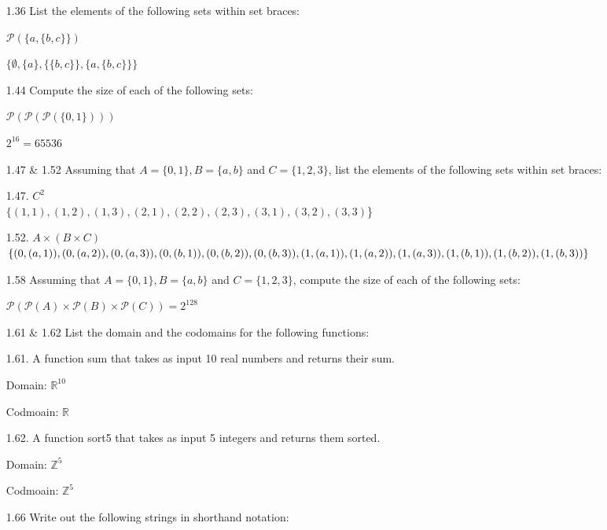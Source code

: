 \documentclass[10pt]{article}
\begin{document}
\begin{enumerate}
      \item [1.36] List the elements of the following sets within set braces:

            $\mathcal{P}(\{a,\{b, c\}\})$

            $\{\emptyset , \{a\}, \{\{b, c\}\}, \{a, \{b, c\}\}\}$

      \item [1.44] Compute the size of each of the following sets:

            $\mathcal{P}(\mathcal{P}(\mathcal{P}(\{0,1\})))$

            $2^{16} = 65536$

      \item [1.47 \& 1.52] Assuming that $A=\{0,1\}, B=\{a, b\}$ and $C=\{1,2,3\}$, list the elements of the following sets within set braces:

            1.47. $C^2$
            \\$\{(1,1), (1,2), (1,3), (2,1), (2,2), (2,3), (3,1), (3,2), (3,3)$\}


                  1.52. $A \times(B \times C)$
            \\$\{(0,(a,1)), (0,(a,2)), (0,(a,3)), (0,(b,1)), (0,(b,2)), (0,(b,3)), (1,(a,1)), (1,(a,2)), (1,(a,3)),
            \\(1,(b,1)), (1,(b,2)), (1,(b,3))\}$

      \item [1.58] Assuming that $A=\{0,1\}, B=\{a, b\}$ and $C=\{1,2,3\}$, compute the size of each of the following sets:

            $\mathcal{P}(\mathcal{P}(A) \times \mathcal{P}(B) \times \mathcal{P}(C)) = 2^{128}$

      \item [1.61 \& 1.62] List the domain and the codomains for the following functions:

            1.61. A function sum that takes as input 10 real numbers and returns their sum.

            Domain: $\mathbb{R}^{10}$

            Codmoain: $\mathbb{R}$


            1.62. A function sort5 that takes as input 5 integers and returns them sorted.

            Domain: $\mathbb{Z}^{5}$

            Codmoain: $\mathbb{Z}^{5}$

      \item [1.66] Write out the following strings in shorthand notation:


\end{enumerate}
\end{document}
